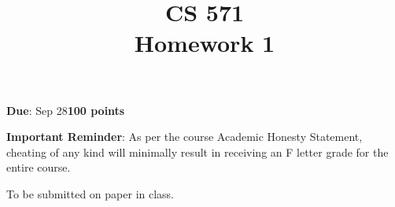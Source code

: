\documentclass[12pt]{article}
\title{CS 571\\Homework 1}
\date{}
\begin{document}
\maketitle

\begin{flushleft}
\textbf{Due}: Sep 28\hfill\textbf{100 points}\\

\vspace{0.5cm}

\textbf{Important Reminder}: As per the course Academic Honesty
Statement, cheating of any kind will minimally result in receiving an
F letter grade for the entire course.


\end{flushleft}

To be submitted on paper in class.
\end{document}

